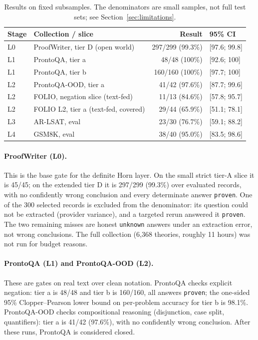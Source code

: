 \documentclass[11pt,a4paper]{article}
\begin{document}
\begin{table}[h]
\centering
\begin{tabular}{llrp{2.6cm}}
\toprule
\textbf{Stage} & \textbf{Collection / slice} & \textbf{Result} & \textbf{95\% CI} \\
\midrule
L0 & ProofWriter, tier D (open world) & 297/299 (99.3\%) & [97.6; 99.8] \\
L1 & ProntoQA, tier a & 48/48 (100\%) & [92.6; 100] \\
L1 & ProntoQA, tier b & 160/160 (100\%) & [97.7; 100] \\
L2 & ProntoQA-OOD, tier a & 41/42 (97.6\%) & [87.7; 99.6] \\
L2 & FOLIO, negation slice (text-fed) & 11/13 (84.6\%) & [57.8; 95.7] \\
L2 & FOLIO L2, tier a (text-fed, covered) & 29/44 (65.9\%) & [51.1; 78.1] \\
L3 & AR-LSAT, eval & 23/30 (76.7\%) & [59.1; 88.2] \\
L4 & GSM8K, eval & 38/40 (95.0\%) & [83.5; 98.6] \\
\bottomrule
\end{tabular}
\caption{Results on fixed subsamples. The denominators are small samples, not full test
sets; see Section~\ref{sec:limitations}.}
\label{tab:results}
\end{table}

\paragraph{ProofWriter (L0).} This is the base gate for the definite Horn layer. On the
small strict tier-A slice it is 45/45; on the extended tier D it is 297/299 (99.3\%) over
evaluated records, with no confidently wrong conclusion and every determinate answer
\texttt{proven}. One of the 300 selected records is excluded from the denominator: its
question could not be extracted (provider variance), and a targeted rerun answered it
\texttt{proven}. The two remaining misses are honest \texttt{unknown} answers under an
extraction error, not wrong conclusions. The full collection (6{,}368 theories, roughly 11
hours) was not run for budget reasons.

\paragraph{ProntoQA (L1) and ProntoQA-OOD (L2).} These are gates on real text over clean
notation. ProntoQA checks explicit negation: tier a is 48/48 and tier b is 160/160, all
answers \texttt{proven}; the one-sided 95\% Clopper--Pearson lower bound on per-problem
accuracy for tier b is 98.1\%. ProntoQA-OOD checks compositional reasoning (disjunction,
case split, quantifiers): tier a is 41/42 (97.6\%), with no confidently wrong conclusion.
After these runs, ProntoQA is considered closed.
\end{document}
